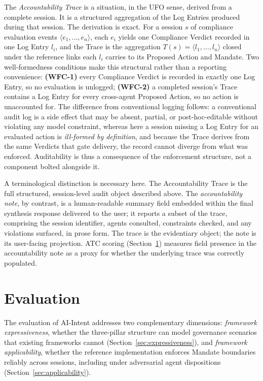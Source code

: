 \documentclass[runningheads]{llncs}
\begin{document}
The \textit{Accountability Trace} is a situation, in the UFO sense,
derived from a complete session. It is a structured aggregation of the
Log Entries produced during that session. The derivation is exact. For a
session $s$ of compliance evaluation events $\langle e_1,\dots,e_n\rangle$,
each $e_i$ yields one Compliance Verdict recorded in one Log Entry $l_i$,
and the Trace is the aggregation $T(s)=\langle l_1,\dots,l_n\rangle$
closed under the reference links each $l_i$ carries to its Proposed
Action and Mandate. Two well-formedness conditions make this structural
rather than a reporting convenience: \textbf{(WFC-1)} every Compliance
Verdict is recorded in exactly one Log Entry, so no evaluation is
unlogged; \textbf{(WFC-2)} a completed session's Trace contains a Log
Entry for every cross-agent Proposed Action, so no action is unaccounted
for. The difference from conventional logging follows: a conventional
audit log is a side effect that may be absent, partial, or
post-hoc-editable without violating any model constraint, whereas here a
session missing a Log Entry for an evaluated action is \emph{ill-formed
by definition}, and because the Trace derives from the same Verdicts that
gate delivery, the record cannot diverge from what was enforced.
Auditability is thus a consequence of the enforcement structure, not a
component bolted alongside it.

A terminological distinction is necessary here. The Accountability Trace
is the full structured, session-level audit object described above. The
\emph{accountability note}, by contrast, is a human-readable summary
field embedded within the final synthesis response delivered to the user;
it reports a subset of the trace, comprising the session identifier,
agents consulted, constraints checked, and any violations surfaced, in
prose form. The trace is the evidentiary object; the note is its
user-facing projection. ATC scoring (Section~\ref{sec:evaluation})
measures field presence in the accountability note as a proxy for
whether the underlying trace was correctly populated.

\section{Evaluation}
\label{sec:evaluation}

The evaluation of AI-Intent addresses two complementary dimensions:
\textit{framework expressiveness}, whether the three-pillar structure
can model governance scenarios that existing frameworks cannot
(Section~\ref{sec:expressiveness}), and \textit{framework
applicability}, whether the reference implementation enforces Mandate
boundaries reliably across sessions, including under adversarial agent
dispositions (Section~\ref{sec:applicability}).
\end{document}
